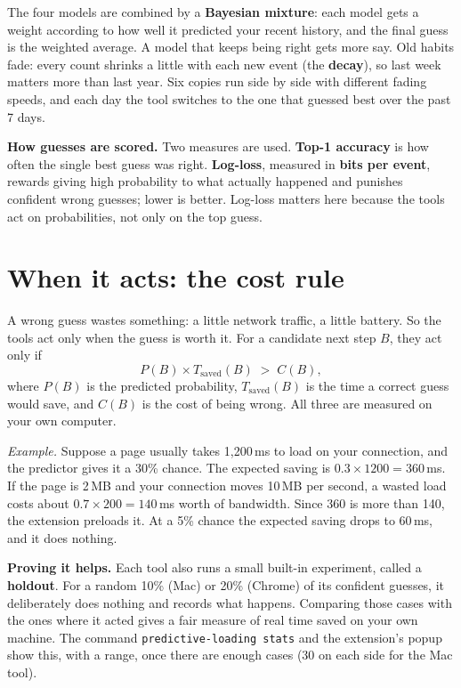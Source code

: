 \documentclass[11pt]{article}
\newcommand{\term}[1]{\textbf{#1}}
\begin{document}
The four models are combined by a \term{Bayesian mixture}: each model gets a weight according to how well it predicted your recent history, and the final guess is the weighted average. A model that keeps being right gets more say. Old habits fade: every count shrinks a little with each new event (the \term{decay}), so last week matters more than last year. Six copies run side by side with different fading speeds, and each day the tool switches to the one that guessed best over the past 7 days.

\textbf{How guesses are scored.} Two measures are used. \term{Top-1 accuracy} is how often the single best guess was right. \term{Log-loss}, measured in \term{bits per event}, rewards giving high probability to what actually happened and punishes confident wrong guesses; lower is better. Log-loss matters here because the tools act on probabilities, not only on the top guess.

\section{When it acts: the cost rule}
A wrong guess wastes something: a little network traffic, a little battery. So the tools act only when the guess is worth it. For a candidate next step $B$, they act only if
\[
P(B) \times T_{\text{saved}}(B) \;>\; C(B),
\]
where $P(B)$ is the predicted probability, $T_{\text{saved}}(B)$ is the time a correct guess would save, and $C(B)$ is the cost of being wrong. All three are measured on your own computer.

\emph{Example.} Suppose a page usually takes 1{,}200\,ms to load on your connection, and the predictor gives it a 30\% chance. The expected saving is $0.3 \times 1200 = 360$\,ms. If the page is 2\,MB and your connection moves 10\,MB per second, a wasted load costs about $0.7 \times 200 = 140$\,ms worth of bandwidth. Since 360 is more than 140, the extension preloads it. At a 5\% chance the expected saving drops to 60\,ms, and it does nothing.

\textbf{Proving it helps.} Each tool also runs a small built-in experiment, called a \term{holdout}. For a random 10\% (Mac) or 20\% (Chrome) of its confident guesses, it deliberately does nothing and records what happens. Comparing those cases with the ones where it acted gives a fair measure of real time saved on your own machine. The command \texttt{predictive-loading stats} and the extension's popup show this, with a range, once there are enough cases (30 on each side for the Mac tool).
\end{document}
